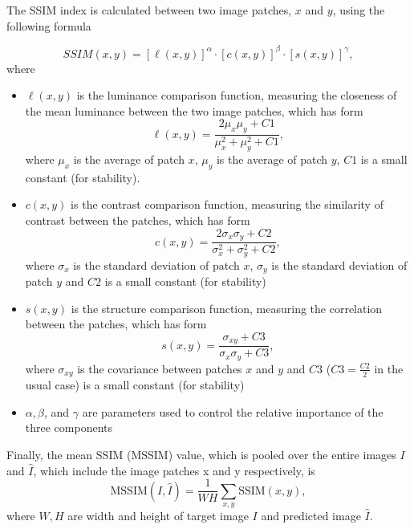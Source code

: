 The SSIM index is calculated between two image patches, $x$ and $y$, using the following formula

\begin{equation}
    SSIM(x, y) = [\ell(x, y)]^\alpha \cdot [c(x, y)]^\beta \cdot [s(x, y)]^\gamma,
\end{equation}
where
\begin{itemize}
    \item $\ell(x, y)$ is the luminance comparison function, measuring the closeness of the mean luminance between the two image patches, which has form
          \begin{equation*}
              \ell(x, y) = \frac{2 \mu_x \mu_y + C1}{\mu_x^2 + \mu_y^2 + C1},
          \end{equation*}
          where $\mu_x$ is the average of patch $x$, $\mu_y$ is the average of patch $y$, $C1$ is a small constant (for stability).
    \item  $c(x, y)$ is the contrast comparison function, measuring the similarity of contrast between the patches, which has form
          \begin{equation*}
              c(x, y) = \frac{2 \sigma_x \sigma_y + C2}{\sigma_x^2 + \sigma_y^2 + C2},
          \end{equation*}
          where $\sigma_x$ is the standard deviation of patch $x$, $\sigma_y$ is the standard deviation of patch $y$ and $C2$ is a small constant (for stability)
    \item $s(x, y)$ is the structure comparison function, measuring the correlation between the patches, which has form
          \begin{equation*}
              s(x, y) = \frac{\sigma_{xy} + C3}{\sigma_x \sigma_y + C3},
          \end{equation*}
          where $\sigma_{xy}$ is the covariance between patches $x$ and $y$ and $C3$ ($C3=\frac{C2}{2}$ in the usual case) is a small constant (for stability)
    \item $\alpha, \beta$, and $\gamma$ are parameters used to control the relative importance of the three components
\end{itemize}
Finally, the mean SSIM (MSSIM) value, which is pooled over the entire images $I$ and $\hat{I}$, which include the image patches x and y respectively, is  
\begin{equation}
    \text{MSSIM}(I, \hat{I}) = \frac{1}{WH} \sum \limits_{x,y} \text{SSIM}(x,y), 
\end{equation}
where $W,H$ are width and height of target image $I$ and predicted image $\hat{I}$.

